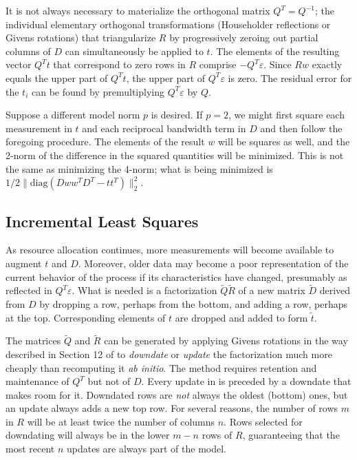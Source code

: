 It is not always necessary to materialize the orthogonal matrix $Q^T = Q^{-1}$;
the individual elementary orthogonal transformations (Householder reflections or Givens rotations)
that triangularize $R$ by progressively zeroing out partial columns of $D$ can simultaneously be applied to $t$.
The elements of the resulting vector $Q^Tt$ that correspond to zero rows in $R$ comprise $-Q^T\varepsilon$.
Since $Rw$ exactly equals the upper part of $Q^Tt$, the upper part of $Q^T\varepsilon$ is zero. The residual error for the $t_i$
can be found by premultiplying $Q^T\varepsilon$ by $Q$.

Suppose a different model norm $p$ is desired.  If $p = 2$, we might first square each measurement in $t$
and each reciprocal bandwidth term in $D$ and then follow the foregoing procedure.
The elements of the result $w$ will be squares as well, and the 2-norm of the difference in the squared quantities will be minimized.  This is not the same as minimizing the 4-norm; what is being minimized is $1/2\|\mbox{diag}(Dww^TD^T - tt^T)\|^2_2$.

\subsection*{Incremental Least Squares}

As resource allocation continues, more measurements will become available to augment $t$ and $D$.
Moreover, older data may become a poor representation of the current behavior of the process if its characteristics have changed,
presumably as reflected in $Q^T\varepsilon$.
What is needed is a factorization $\tilde{Q}\tilde{R}$ of a new matrix $\tilde{D}$
derived from $D$ by dropping a row, perhaps from the bottom,
and adding a row, perhaps at the top.
Corresponding elements of $t$ are dropped and added to form $\tilde{t}$.

The matrices $\tilde{Q}$ and $\tilde{R}$ can be generated by applying Givens rotations
in the way described in Section 12 of \cite{GoVL} to \emph{downdate} or \emph{update} the factorization
much more cheaply than recomputing it \emph{ab initio}.
The method requires retention and maintenance of $Q^T$ but not of $D$.
Every update in \pacora is preceded by a downdate that makes room for it.
Downdated rows are \emph{not} always the oldest (bottom) ones, but
an update always adds a new top row.
For several reasons, the number of rows $m$ in $R$
will be at least twice the number of columns $n$.
Rows selected for downdating will always be in the lower $m - n$ rows of $R$,
guaranteeing that the most recent $n$ updates are always part of the model.


